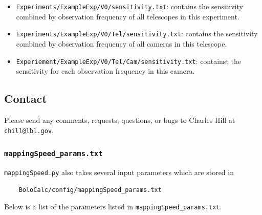 \documentclass[11pt]{article} %
\begin{document}
\begin{itemize}
	\item \texttt{Experiments/ExampleExp/V0/sensitivity.txt}: contains the sensitivity combined by observation frequency of all telescopes in this experiment.
	\item \texttt{Experiments/ExampleExp/V0/Tel/sensitivity.txt}: contains the sensitivity combined by observation frequency of all cameras in this telescope.
	\item \texttt{Experiement/ExampleExp/V0/Tel/Cam/sensitivity.txt}: containst the sensitivity for each observation frequency in this camera.
\end{itemize}


\subsection{Contact}

Please send any comments, requests, questions, or bugs to Charles Hill at \texttt{chill@lbl.gov}.


\iffalse
\subsubsection{\texttt{mappingSpeed\_params.txt}}

\texttt{mappingSpeed.py} also takes several input parameters which are stored in 

\begin{lstlisting}
	BoloCalc/config/mappingSpeed_params.txt
\end{lstlisting}

Below is a list of the parameters listed in \texttt{mappingSpeed\_params.txt}.
\end{document}
